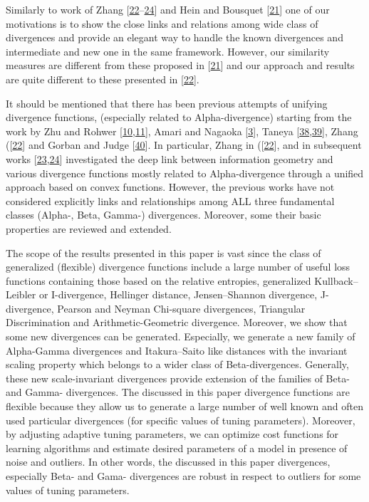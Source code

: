 Similarly to work of Zhang [\hyperlink{B22-entropy-12-01532}{22}--\hyperlink{B24-entropy-12-01532}{24}] and Hein and Bousquet [\hyperlink{B21-entropy-12-01532}{21}] one of our motivations is to show the close links and relations among wide class of divergences and provide an elegant way to handle the known divergences and intermediate and new one in the same framework. However, our similarity measures are different from these proposed in [\hyperlink{B21-entropy-12-01532}{21}] and our approach and results are quite different to these presented in [\hyperlink{B22-entropy-12-01532}{22}].


It should be mentioned that there has been previous attempts of unifying divergence functions, (especially related to Alpha-divergence) starting from the work by Zhu and Rohwer [\hyperlink{B10-entropy-12-01532}{10},\allowbreak \hyperlink{B11-entropy-12-01532}{11}], Amari and Nagaoka [\hyperlink{B3-entropy-12-01532}{3}], Taneya [\hyperlink{B38-entropy-12-01532}{38},\allowbreak \hyperlink{B39-entropy-12-01532}{39}], Zhang ([\hyperlink{B22-entropy-12-01532}{22}] and Gorban and Judge [\hyperlink{B40-entropy-12-01532}{40}]. In particular, Zhang in ([\hyperlink{B22-entropy-12-01532}{22}], and in subsequent works [\hyperlink{B23-entropy-12-01532}{23},\allowbreak \hyperlink{B24-entropy-12-01532}{24}] investigated the deep link between information geometry and various divergence functions mostly related to Alpha-divergence through a unified approach based on convex functions. However, the previous works have not considered explicitly links and relationships among ALL three fundamental classes (Alpha-, Beta, Gamma-) divergences. Moreover, some their basic properties are reviewed and extended.


The scope of the results presented in this paper is vast since the class of generalized (flexible) divergence functions include a large number of useful loss functions containing those based on the relative entropies, generalized Kullback–Leibler or I-divergence, Hellinger distance, Jensen–Shannon divergence, J-divergence, Pearson and Neyman Chi-square divergences, Triangular Discrimination and Arithmetic-Geometric divergence. Moreover, we show that some new divergences can be generated. Especially, we generate a new family of Alpha-Gamma divergences and Itakura–Saito like distances with the invariant scaling property which belongs to a wider class of Beta-divergences. Generally, these new scale-invariant divergences provide extension of the families of Beta- and Gamma- divergences. The discussed in this paper divergence functions are flexible because they allow us to generate a large number of well known and often used particular divergences (for specific values of tuning parameters). Moreover, by adjusting adaptive tuning parameters, we can optimize cost functions for learning algorithms and estimate desired parameters of a model in presence of noise and outliers. In other words, the discussed in this paper divergences, especially Beta- and Gama- divergences are robust in respect to outliers for some values of tuning parameters.


